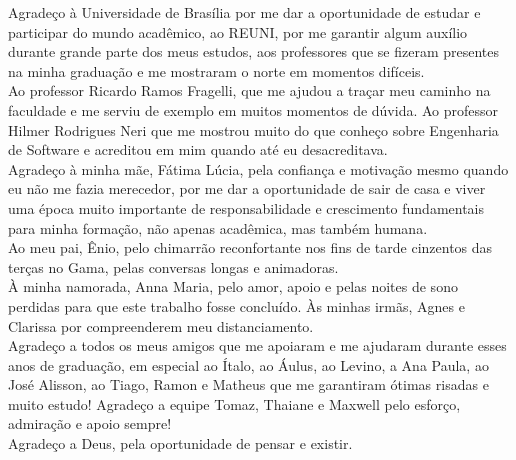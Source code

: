 \begin{agradecimentos}

Agradeço à Universidade de Brasília por me dar a oportunidade de estudar e participar do mundo acadêmico, ao REUNI, por me garantir algum auxílio durante grande parte dos meus estudos, aos professores que se fizeram presentes na minha graduação e me mostraram o norte em momentos difíceis.\\

Ao professor Ricardo Ramos Fragelli, que me ajudou a traçar meu caminho na faculdade e me serviu de exemplo em muitos momentos de dúvida. Ao professor Hilmer Rodrigues Neri que me mostrou muito do que conheço sobre Engenharia de Software e acreditou em mim quando até eu desacreditava.\\

Agradeço à minha mãe, Fátima Lúcia, pela confiança e motivação mesmo quando eu não me fazia merecedor, por me dar a oportunidade de sair de casa e viver uma época muito importante de responsabilidade e crescimento fundamentais para minha formação, não apenas acadêmica, mas também humana.\\

Ao meu pai, Ênio, pelo chimarrão reconfortante nos fins de tarde cinzentos das terças no Gama, pelas conversas longas e animadoras.\\

À minha namorada, Anna Maria, pelo amor, apoio e pelas noites de sono perdidas para que este trabalho fosse concluído. Às minhas irmãs, Agnes e Clarissa por compreenderem meu distanciamento.\\

Agradeço a todos os meus amigos que me apoiaram e me ajudaram durante esses anos de graduação, em especial ao Ítalo, ao Áulus, ao Levino, a Ana Paula, ao José Alisson, ao Tiago, Ramon e Matheus que me garantiram ótimas risadas e muito estudo! Agradeço a equipe Tomaz, Thaiane e Maxwell pelo esforço, admiração e apoio sempre!\\

Agradeço a Deus, pela oportunidade de pensar e existir.

\end{agradecimentos}
